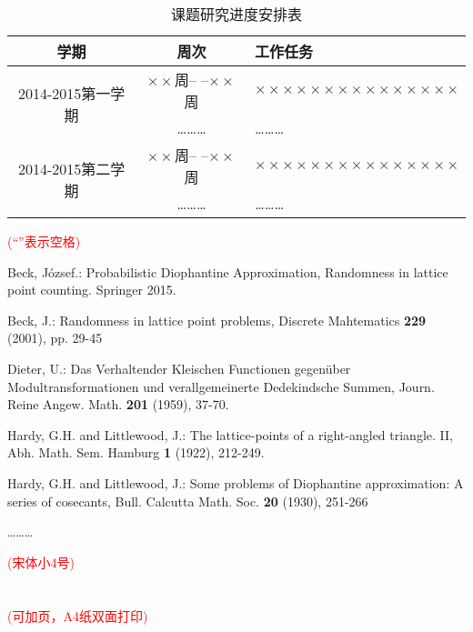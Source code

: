 \documentclass[11pt,a4paper]{article}
\newcommand{\xiaosihao}{\fontsize{12pt}{24pt}\selectfont}
\newcommand{\wuhao}{\fontsize{10.5pt}{18pt}\selectfont}
\newcommand\seccontent{
	\xiaosihao %
    \setlength{\parindent}{2em} %
    \setlength{\parskip}{0pt}
    }
\theoremstyle{definition}
\numberwithin{equation}{section}
\begin{document}
    \begin{table}[htpb]
    	\seccontent
    	\centering
        \caption{课题研究进度安排表}	
    
    	\begin{tabular}{ccp{18em}<{\centering}}
    		\hline
    		学期&周次&工作任务\\\hline
    		\multirow{2}{5em}{2014-2015第一学期}& $ \times\times $周-- --$\times\times $周&$\times\times\times\times\times\times\times\times\times\times\times\times\times\times\times $\\
    		\cline{2-3}
    		&\ldots\ldots\ldots&\ldots\ldots\ldots\\
    		\hline\multirow{2}{5em}{2014-2015第二学期}& $ \times\times $周-- --$\times\times $周&$\times\times\times\times\times\times\times\times\times\times\times\times\times\times\times $\\
    		\cline{2-3}
    		&\ldots\ldots\ldots&\ldots\ldots\ldots\\
    		\hline
    	\end{tabular}
    \end{table}
     {\wuhao\textcolor{red}{(``\fbox{\phantom{x}}''表示空格)}}
    










    	
	\begin{thebibliography}{2}		
	 \seccontent
	 Beck, J\'ozsef.: Probabilistic Diophantine Approximation, Randomness in lattice point counting. Springer 2015.
	  
	 Beck, J.: Randomness in lattice point problems, Discrete Mahtematics \textbf{229} (2001), pp. 29-45
	 
	 Dieter, U.: Das Verhaltender Kleischen Functionen gegen\"uber Modultransformationen und verallgemeinerte Dedekindsche Summen, Journ. Reine Angew. Math. \textbf{201} (1959), 37-70.
	 
	 Hardy, G.H. and Littlewood, J.: The lattice-points of a right-angled triangle. II, Abh. Math. Sem. Hamburg \textbf{1} (1922), 212-249.
	 
	 Hardy, G.H. and Littlewood, J.: Some problems of Diophantine approximation: A series of cosecants, Bull. Calcutta Math. Soc. \textbf{20} (1930), 251-266 

	\end{thebibliography}
%	

      \hspace{15em} \ldots\ldots\ldots
      
      {\wuhao\textcolor{red}{(宋体小4号)}}
      \\
      \\
      \\
      {\wuhao\textcolor{red}{(可加页，A4纸双面打印)}}
\end{document}
